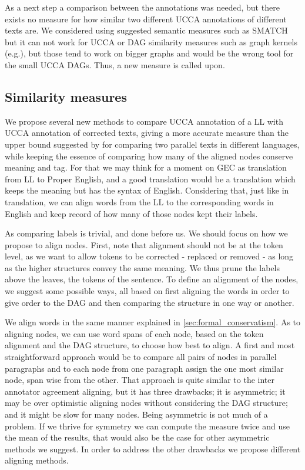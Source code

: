 \documentclass[english]{article}
\begin{document}
As a next step a comparison between the annotations was needed, but
there exists no measure for how similar two different UCCA annotations
of different texts are. We considered using suggested semantic measures
such as SMATCH\cite{cai2013smatch} but it can not work for UCCA or
DAG similarity measures such as graph kernels (e.g.\cite{kashima2003marginalized}),
but those tend to work on bigger graphs and would be the wrong tool
for the small UCCA DAGs. Thus, a new measure is called upon.

\subsection{Similarity measures\label{subsec:Similarity-measures}}

We propose several new methods to compare UCCA annotation of a LL with UCCA annotation of corrected texts, giving a more accurate
measure than the upper bound suggested by \cite{sulem2015conceptual}for
comparing two parallel texts in different languages, while keeping
the essence of comparing how many of the aligned nodes conserve meaning
and tag. For that we may think for a moment on GEC as
translation from LL to Proper English, and a good translation
would be a translation which keeps the meaning but has the syntax
of English. Considering that, just like in translation, we can align
words from the LL to the corresponding words in English
and keep record of how many of those nodes kept their labels.

As comparing labels is trivial, and done before us. We should focus on how we propose to
align nodes. First, note that alignment should not be at
the token level, as we want to allow tokens to be corrected - replaced or removed -
as long as the higher structures convey the same meaning. We thus
prune the labels above the leaves, the tokens of the sentence. To
define an alignment of the nodes, we suggest some possible ways, all
based on first aligning the words in order to give order to the DAG
and then comparing the structure in one way or another.

We align words in the same manner explained in \ref{sec:formal_conservatism}. As to aligning nodes, we can use word spans of each node, based on
the token alignment and the DAG structure, to choose how best to align.
A first and most straightforward approach would be to compare all
pairs of nodes in parallel paragraphs and to each node from one paragraph
assign the one most similar node, span wise from the other. That approach
is quite similar to the inter annotator agreement aligning, but it
has three drawbacks; it is asymmetric; it may be over optimistic aligning
nodes without considering the DAG structure; and it might be
slow for many nodes. Being asymmetric is not much of a problem. If we thrive for symmetry
we can compute the measure twice and use the mean of the results,
that would also be the case for other asymmetric methods we suggest.
In order to address the other drawbacks we propose different aligning methods.
\end{document}
